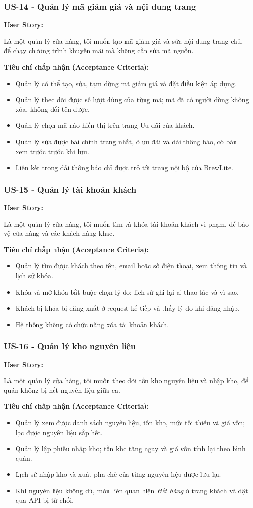 \documentclass[12pt,a4paper]{article}
\newcommand{\userstory}[2]{%
  \noindent\textbf{User Story:}\par
  #1\par
  \hspace*{\parindent}\textbf{Tiêu chí chấp nhận (Acceptance Criteria):}
  \begin{itemize}
    #2
  \end{itemize}}
\begin{document}
\subsubsection{US-14 - Quản lý mã giảm giá và nội dung trang}
\userstory{Là một quản lý cửa hàng, tôi muốn tạo mã giảm giá và sửa nội dung trang chủ, để chạy chương trình khuyến mãi mà không cần sửa mã nguồn.}{
  \item Quản lý có thể tạo, sửa, tạm dừng mã giảm giá và đặt điều kiện áp dụng.
  \item Quản lý theo dõi được số lượt dùng của từng mã; mã đã có người dùng không xóa, không đổi tên được.
  \item Quản lý chọn mã nào hiển thị trên trang Ưu đãi của khách.
  \item Quản lý sửa được bài chính trang nhất, ô ưu đãi và dải thông báo, có bản xem trước trước khi lưu.
  \item Liên kết trong dải thông báo chỉ được trỏ tới trang nội bộ của BrewLite.
}

\subsubsection{US-15 - Quản lý tài khoản khách}
\userstory{Là một quản lý cửa hàng, tôi muốn tìm và khóa tài khoản khách vi phạm, để bảo vệ cửa hàng và các khách hàng khác.}{
  \item Quản lý tìm được khách theo tên, email hoặc số điện thoại, xem thông tin và lịch sử khóa.
  \item Khóa và mở khóa bắt buộc chọn lý do; lịch sử ghi lại ai thao tác và vì sao.
  \item Khách bị khóa bị đăng xuất ở request kế tiếp và thấy lý do khi đăng nhập.
  \item Hệ thống không có chức năng xóa tài khoản khách.
}

\subsubsection{US-16 - Quản lý kho nguyên liệu}
\userstory{Là một quản lý cửa hàng, tôi muốn theo dõi tồn kho nguyên liệu và nhập kho, để quán không bị hết nguyên liệu giữa ca.}{
  \item Quản lý xem được danh sách nguyên liệu, tồn kho, mức tối thiểu và giá vốn; lọc được nguyên liệu sắp hết.
  \item Quản lý lập phiếu nhập kho; tồn kho tăng ngay và giá vốn tính lại theo bình quân.
  \item Lịch sử nhập kho và xuất pha chế của từng nguyên liệu được lưu lại.
  \item Khi nguyên liệu không đủ, món liên quan hiện \textit{Hết hàng} ở trang khách và đặt qua API bị từ chối.
}
\end{document}
